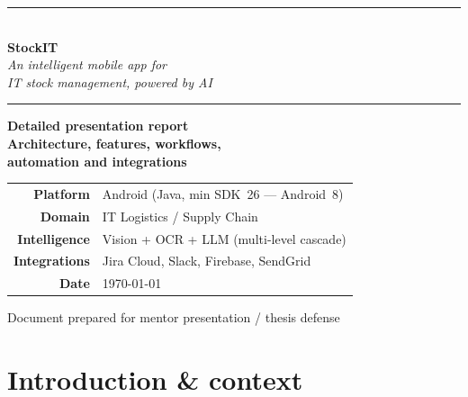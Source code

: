 \documentclass[11pt,a4paper]{article}
\begin{document}
\thispagestyle{empty}
\begin{center}
\vspace*{1.5cm}
{\color{primary}\rule{\linewidth}{1.2pt}}\\[6pt]
{\Huge\bfseries\color{primary} StockIT}\\[6pt]
{\Large\itshape An intelligent mobile app for\\
IT stock management, powered by AI}\\[4pt]
{\color{primary}\rule{\linewidth}{1.2pt}}

\vspace{2.5cm}

\begin{tcolorbox}[colback=soft, colframe=primary,
  boxrule=0.5pt, arc=5pt, width=0.85\linewidth, halign=center]
\Large\bfseries Detailed presentation report\\[4pt]
\normalsize\normalfont
Architecture, features, workflows,\\
automation and integrations
\end{tcolorbox}

\vspace{3cm}

\begin{tabular}{rl}
\textbf{Platform}       & Android (Java, min SDK~26 — Android~8)\\[3pt]
\textbf{Domain}         & IT Logistics / Supply Chain\\[3pt]
\textbf{Intelligence}   & Vision + OCR + LLM (multi-level cascade)\\[3pt]
\textbf{Integrations}   & Jira Cloud, Slack, Firebase, SendGrid\\[3pt]
\textbf{Date}           & \today
\end{tabular}

\vfill
{\color{primary!70}\small Document prepared for mentor presentation / thesis defense}
\end{center}

\newpage

\tableofcontents
\newpage

\section{Introduction \& context}
\end{document}
